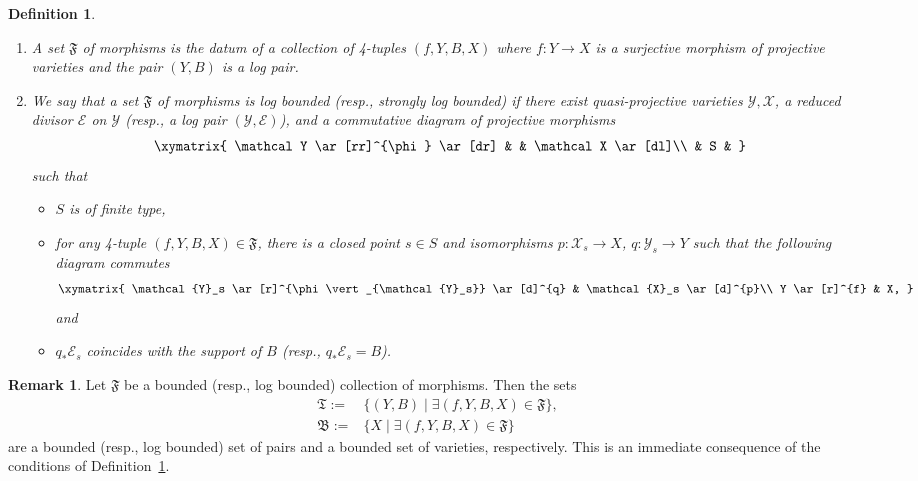 \documentclass[11pt]{ip-journal}
\newtheorem{definition}[theorem]{Definition}
\theoremstyle{definition}
\newtheorem{remark}[theorem]{Remark}
\newcommand{\mcy}{\mathcal{Y}}
\begin{document}
\begin{definition}
\label{bound.morph.def}
\begin{enumerate}
    \item[(i)] 
A set 
$\mathfrak F$ 
of morphisms is the datum of a collection of 4-tuples 
$(f, Y, B, X)$ 
where 
$f \colon Y \to X$ 
is a surjective morphism of projective varieties and the pair 
$(Y, B)$ 
is a log pair.

    \item[(ii)] 
We say that a set $\mathfrak F$ of morphisms is \emph{log bounded} (resp., \emph{strongly log bounded}) if there exist quasi-projective varieties $\mathcal Y, \mathcal X$, a reduced divisor $\mathcal{E}$ on $\mcy$ (resp., a log pair $(\mathcal Y, \mathcal{E})$), and a commutative diagram of projective morphisms 
\begin{align*}
\xymatrix{
\mathcal Y \ar[rr]^{\phi} \ar[dr] & 
&
\mathcal X \ar[dl]\\
 & S &
}
\end{align*}
such that 
\begin{itemize}
    \item 
$S$ is of finite type, 
    \item 
for any 4-tuple $(f, Y, B, X)\in \mathfrak{F}$, there is a closed point $s \in S$ and isomorphisms $p \colon \mathcal{X}_s \to X$, $q \colon \mathcal{Y}_s \to Y$ such that the following diagram commutes
\begin{align*}
\xymatrix{
\mathcal{Y}_s \ar[r]^{\phi\vert_{\mathcal{Y}_s}} \ar[d]^{q} & 
\mathcal{X}_s \ar[d]^{p}\\
Y  \ar[r]^{f} &
X,
}
\end{align*}
and

\item 
$q_\ast \mathcal{E}_{s}$ coincides with the support of $B$ (resp., $q_\ast \mathcal{E}_{s}=B$).
\end{itemize}
\end{enumerate}
\end{definition}

\begin{remark}
\label{bound.morph.imply.bound.rmk}
Let $\mathfrak{F}$ be a bounded (resp., log bounded) collection of morphisms.
Then the sets
\begin{align*}
    \mathfrak T := & \{(Y, B) \; \vert \; \exists (f, Y, B, X) \in \mathfrak F\},\\
    \mathfrak B := & \{ X \; \vert \; \exists (f, Y, B, X) \in \mathfrak F\}
\end{align*}
are a bounded (resp., log bounded) set of pairs and a bounded set of varieties, respectively.
This is an immediate consequence of the conditions of Definition~\ref{bound.morph.def}.
\end{remark}
\end{document}

